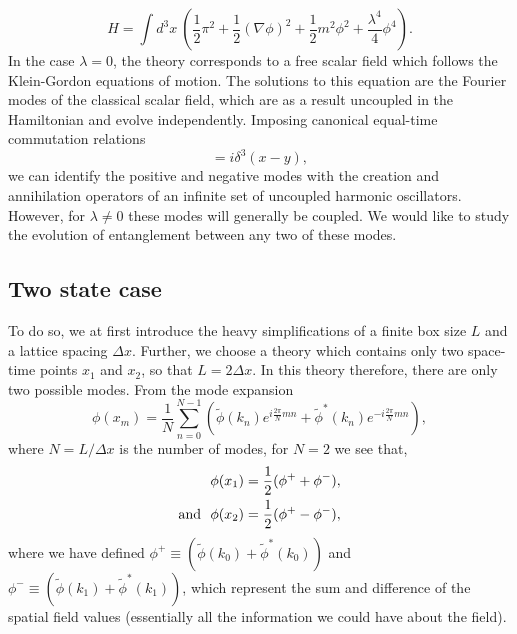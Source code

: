 \documentclass[aps,showpacs,onecolumn,floats,prd,superscriptaddress,nofootinbib]{revtex4-1}
\begin{document}
\begin{equation}
H = \int d^3x~ \left( \frac{1}{2} \pi^2 + \frac{1}{2} (\nabla \phi)^2 + \frac{1}{2}m^2\phi^2 + \frac{\lambda^4}{4}\phi^4\right).
\end{equation}
In the case $\lambda = 0$, the theory corresponds to a free scalar field which follows the Klein-Gordon equations of motion. The solutions to this equation are the Fourier modes of the classical scalar field, which are as a result uncoupled in the Hamiltonian and evolve independently. Imposing canonical equal-time commutation relations
\begin{equation}
[\pi(x, t), \phi(y, t)] = i \delta^3(x - y),
\end{equation}
we can identify the positive and negative modes with the creation and annihilation operators of an infinite set of uncoupled harmonic oscillators. However, for $\lambda \neq 0$ these modes will generally be coupled. We would like to study the evolution of entanglement between any two of these modes. 

\subsection{Two state case} \label{subsec:twostate}

To do so, we at first introduce the heavy simplifications of a finite box size $L$ and a lattice spacing $\Delta x$. Further, we choose a theory which contains only two space-time points $x_1$ and $x_2$, so that $L = 2 \Delta x$. In this theory therefore, there are only two possible modes. From the mode expansion
\begin{equation}
\phi(x_m) = \frac{1}{N} \sum_{n = 0}^{N - 1} (\tilde{\phi}(k_n) e^{i \frac{2\pi}{N} m n} + \tilde{\phi}^*(k_n)  e^{-i \frac{2\pi}{N} m n}), 
\end{equation}
where $N = L/\Delta x$ is the number of modes, for $N=2$ we see that,
\begin{align}
\phi(x_1) &= \frac{1}{2} (\phi^+ + \phi^-), 
\\ {\rm and} ~~\phi(x_2) &= \frac{1}{2} (\phi^+ - \phi^-), 
\end{align}
where we have defined $\phi^+ \equiv (\tilde{\phi}(k_0) + \tilde{\phi}^*(k_0))$ and $\phi^- \equiv (\tilde{\phi}(k_1) + \tilde{\phi}^*(k_1))$, which represent the sum and difference of the spatial field values (essentially all the information we could have about the field). 
\end{document}
